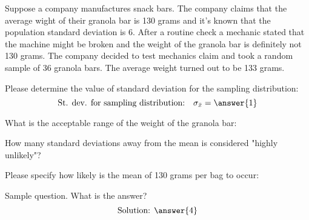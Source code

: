 \documentclass{ximera}
\begin{document}
\begin{example}
Suppose a company manufactures snack bars. The company claims that the average wight of their granola bar is 130 grams and it's known that the population standard deviation is 6. After a routine check a mechanic stated that the machine might be broken and the weight of the granola bar is definitely not 130 grams. The company decided to test mechanics claim and took a random sample of 36 granola bars. The average weight turned out to be 133 grams.

\begin{question}
Please determine the value of standard deviation for the sampling distribution:
$$\mbox{St. dev. for sampling distribution:}\quad\sigma_{\bar{x}}= \answer{1}$$
\end{question}

\begin{question}
What is the acceptable range of the weight of the granola bar:
\begin{multipleChoice}
\end{multipleChoice}
\end{question}

\begin{question}
How many standard deviations away from the mean is considered "highly unlikely"?
\begin{multipleChoice}
\end{multipleChoice}
\end{question}

\begin{question}
Please specify how likely is the mean of 130 grams per bag to occur:
\begin{multipleChoice}
\end{multipleChoice}
\end{question}

Sample question.  What is the answer?
$$\text{Solution: }\answer{4}$$

\end{example}
\end{document}
